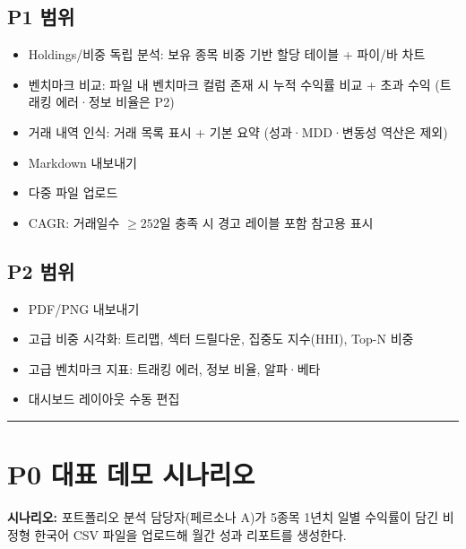 \documentclass[10pt,a4paper]{article}
\providecommand{\tightlist}{\setlength{\itemsep}{0pt}\setlength{\parskip}{0pt}}
\begin{document}
\subsection{P1 범위}\label{p1-uxbc94uxc704}

\begin{itemize}
\tightlist
\item
  Holdings/비중 독립 분석: 보유 종목 비중 기반 할당 테이블 + 파이/바 차트
\item
  벤치마크 비교: 파일 내 벤치마크 컬럼 존재 시 누적 수익률 비교 + 초과 수익 (트래킹 에러·정보 비율은 P2)
\item
  거래 내역 인식: 거래 목록 표시 + 기본 요약 (성과·MDD·변동성 역산은 제외)
\item
  Markdown 내보내기
\item
  다중 파일 업로드
\item
  CAGR: 거래일수 $\geq 252$일 충족 시 경고 레이블 포함 참고용 표시
\end{itemize}

\subsection{P2 범위}\label{p2-uxbc94uxc704}

\begin{itemize}
\tightlist
\item
  PDF/PNG 내보내기
\item
  고급 비중 시각화: 트리맵, 섹터 드릴다운, 집중도 지수(HHI), Top-N 비중
\item
  고급 벤치마크 지표: 트래킹 에러, 정보 비율, 알파·베타
\item
  대시보드 레이아웃 수동 편집
\end{itemize}

\begin{center}\rule{0.5\linewidth}{0.5pt}\end{center}

\section{P0 대표 데모 시나리오}\label{p0-uxb300uxd45c-uxb370uxbaa8-uxc2dcuxb098uxb9acuxc624}

\textbf{시나리오:} 포트폴리오 분석 담당자(페르소나 A)가 5종목 1년치 일별 수익률이 담긴 비정형 한국어 CSV 파일을 업로드해 월간 성과 리포트를 생성한다.
\end{document}
